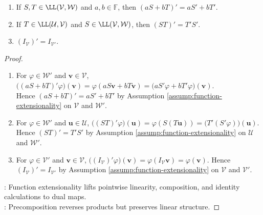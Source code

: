 \begin{theorem} \label{thm:algebra-of-dual-maps} 
\begin{enumerate}[label=(\roman*)]
\setlength{\itemsep}{0pt}
\item If $S,T\in\LL(\mathcal{V},\mathcal{W})$ and $a,b\in\mathbb{F}$, then $(aS+bT)'=aS'+bT'$.
\item If $T\in\LL(\mathcal{U},\mathcal{V})$ and $S\in\LL(\mathcal{V},\mathcal{W})$, then $(ST)'=T'S'$.
\item $(I_{\mathcal{V}})'=I_{\mathcal{V}'}$.
\end{enumerate}
\begin{proof}
\begin{enumerate}[label=(\roman*)]
\setlength{\itemsep}{0pt}
\item For $\varphi\in\mathcal{W}'$ and $\mathbf{v}\in\mathcal{V}$, $\bigl((aS+bT)'\varphi\bigr)(\mathbf{v})=\varphi(aS\mathbf{v}+bT\mathbf{v})=\bigl(aS'\varphi+bT'\varphi\bigr)(\mathbf{v})$.\\
Hence $(aS+bT)'=aS'+bT'$ by Assumption \ref{assump:function-extensionality} on $\mathcal{V}$ and $\mathcal{W}'$.
\item For $\varphi\in\mathcal{W}'$ and $\mathbf{u}\in\mathcal{U}$, $\bigl((ST)'\varphi\bigr)(\mathbf{u})=\varphi(S(T\mathbf{u}))=\bigl(T'(S'\varphi)\bigr)(\mathbf{u})$. Hence $(ST)'=T'S'$ by Assumption \ref{assump:function-extensionality} on $\mathcal{U}$ and $\mathcal{W}'$.
\item For $\varphi\in\mathcal{V}'$ and $\mathbf{v}\in\mathcal{V}$, $\bigl((I_{\mathcal{V}})'\varphi\bigr)(\mathbf{v})=\varphi(I_{\mathcal{V}}\mathbf{v})=\varphi(\mathbf{v})$. Hence $(I_{\mathcal{V}})'=I_{\mathcal{V}'}$ by Assumption \ref{assump:function-extensionality} on $\mathcal{V}$ and $\mathcal{V}'$.
\end{enumerate}
: Function extensionality lifts pointwise linearity, composition, and identity calculations to dual maps.\\
: Precomposition reverses products but preserves linear structure.
\end{proof}
\end{theorem}

